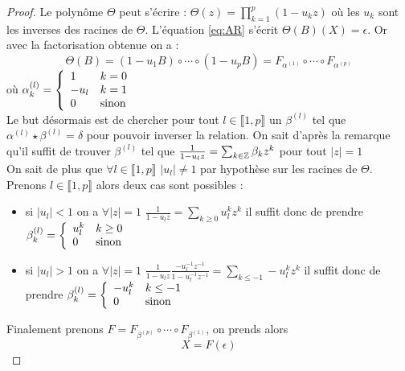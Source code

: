\documentclass{report}
\begin{document}
\begin{proof}
Le polynôme $\Theta$ peut s'écrire : $\Theta(z)=\prod_{k=1}^p (1-u_k z)$ où les $u_k$ sont les inverses des racines de $\Theta$. L'équation \eqref{eq:AR} s'écrit $\Theta(B)(X)=\epsilon$. Or avec la factorisation obtenue on a : 
\[
\Theta(B) = (1-u_1 B) \circ \cdots \circ (1-u_p B) = F_{\alpha^{(1)}} \circ \cdots \circ F_{\alpha^{(p)}}
\]
où $\alpha_k^{(l)} = { \left\lbrace \begin{array}{ll} 
1 & k=0 \\
-u_l & k=1 \\
0 & \text{sinon} \\ \end{array} \right. }
$ \\
Le but désormais est de chercher pour tout $l \in \llbracket 1, p \rrbracket$ un $\beta^{(l)}$ tel que $\alpha^{(l)} \star \beta^{(l)} = \delta$ pour pouvoir inverser la relation. On sait d'après la remarque qu'il suffit de trouver $\beta^{(l)}$ tel que $\frac{1}{1-u_l z} = \sum_{k \in \mathbb{Z}} \beta_k z^k$ pour tout $|z|=1$ \\
On sait de plus que $\forall l \in \llbracket 1, p \rrbracket$ $|u_l| \neq 1$ par hypothèse sur les racines de $\Theta$.\\
Prenons $l\in \llbracket 1,p \rrbracket$ alors deux cas sont possibles :
\begin{itemize}
\item si $|u_l|< 1$ on a $\forall |z|=1$ $\frac{1}{1-u_l z} = \sum_{k \geq 0} u_l^k z^k$ il suffit donc de prendre $\beta_k^{(l)} = { \left\lbrace \begin{array}{ll} 
u_l^k & k \geq 0 \\
0 & \text{sinon} \\
 \end{array} \right. }$
\item si $|u_l|> 1$ on a $\forall |z|=1$ $\frac{1}{1-u_l z} \frac{-u_l^{-1} z^{-1}}{1-u_l^{-1} z^{-1}} = \sum_{k \leq -1} -u_l^k z^k$ il suffit donc de prendre $\beta_k^{(l)} = { \left\lbrace \begin{array}{ll} 
-u_l^k & k \leq -1 \\
0 & \text{sinon} \\
 \end{array} \right. }$
\end{itemize}
Finalement prenons $F = F_{\beta^{(p)}} \circ \cdots \circ F_{\beta^{(1)}}$, on prends alors 
\[
X = F(\epsilon) 
\]
\end{proof}
\end{document}
